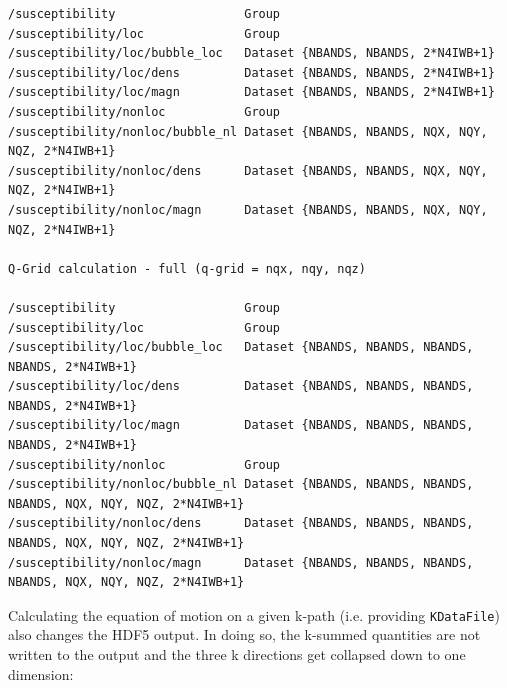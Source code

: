 \documentclass[a4paper,11pt]{article}
\numberwithin{equation}{section} %
\begin{document}
\begin{lstlisting}[caption=susceptibility output comparison, frame=single, basicstyle=\scriptsize]
/susceptibility                  Group
/susceptibility/loc              Group
/susceptibility/loc/bubble_loc   Dataset {NBANDS, NBANDS, 2*N4IWB+1}
/susceptibility/loc/dens         Dataset {NBANDS, NBANDS, 2*N4IWB+1}
/susceptibility/loc/magn         Dataset {NBANDS, NBANDS, 2*N4IWB+1}
/susceptibility/nonloc           Group
/susceptibility/nonloc/bubble_nl Dataset {NBANDS, NBANDS, NQX, NQY, NQZ, 2*N4IWB+1}
/susceptibility/nonloc/dens      Dataset {NBANDS, NBANDS, NQX, NQY, NQZ, 2*N4IWB+1}
/susceptibility/nonloc/magn      Dataset {NBANDS, NBANDS, NQX, NQY, NQZ, 2*N4IWB+1}

Q-Grid calculation - full (q-grid = nqx, nqy, nqz)

/susceptibility                  Group
/susceptibility/loc              Group
/susceptibility/loc/bubble_loc   Dataset {NBANDS, NBANDS, NBANDS, NBANDS, 2*N4IWB+1}
/susceptibility/loc/dens         Dataset {NBANDS, NBANDS, NBANDS, NBANDS, 2*N4IWB+1}
/susceptibility/loc/magn         Dataset {NBANDS, NBANDS, NBANDS, NBANDS, 2*N4IWB+1}
/susceptibility/nonloc           Group
/susceptibility/nonloc/bubble_nl Dataset {NBANDS, NBANDS, NBANDS, NBANDS, NQX, NQY, NQZ, 2*N4IWB+1}
/susceptibility/nonloc/dens      Dataset {NBANDS, NBANDS, NBANDS, NBANDS, NQX, NQY, NQZ, 2*N4IWB+1}
/susceptibility/nonloc/magn      Dataset {NBANDS, NBANDS, NBANDS, NBANDS, NQX, NQY, NQZ, 2*N4IWB+1}

\end{lstlisting}

\newpage
Calculating the equation of motion on a given k-path (i.e. providing \verb+KDataFile+) also changes the HDF5 output.
In doing so, the k-summed quantities are not written to the output and the three k directions
get collapsed down to one dimension:
\end{document}
